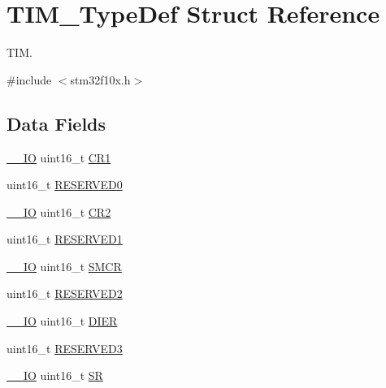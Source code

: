 \hypertarget{struct_t_i_m___type_def}{}\section{T\+I\+M\+\_\+\+Type\+Def Struct Reference}
\label{struct_t_i_m___type_def}


T\+IM.  




{\ttfamily \#include $<$stm32f10x.\+h$>$}

\subsection*{Data Fields}
\begin{DoxyCompactItemize}
\item 
\mbox{\hyperlink{core__sc300_8h_aec43007d9998a0a0e01faede4133d6be}{\+\_\+\+\_\+\+IO}} uint16\+\_\+t \mbox{\hyperlink{struct_t_i_m___type_def_a61400ce239355b62aa25c95fcc18a5e1}{C\+R1}}
\item 
uint16\+\_\+t \mbox{\hyperlink{struct_t_i_m___type_def_a149feba01f9c4a49570c6d88619f504f}{R\+E\+S\+E\+R\+V\+E\+D0}}
\item 
\mbox{\hyperlink{core__sc300_8h_aec43007d9998a0a0e01faede4133d6be}{\+\_\+\+\_\+\+IO}} uint16\+\_\+t \mbox{\hyperlink{struct_t_i_m___type_def_a2a3e81bd118d1bc52d24a0b0772e6a0c}{C\+R2}}
\item 
uint16\+\_\+t \mbox{\hyperlink{struct_t_i_m___type_def_a8249a3955aace28d92109b391311eb30}{R\+E\+S\+E\+R\+V\+E\+D1}}
\item 
\mbox{\hyperlink{core__sc300_8h_aec43007d9998a0a0e01faede4133d6be}{\+\_\+\+\_\+\+IO}} uint16\+\_\+t \mbox{\hyperlink{struct_t_i_m___type_def_a02758713abfe580460dd5bcd8762702a}{S\+M\+CR}}
\item 
uint16\+\_\+t \mbox{\hyperlink{struct_t_i_m___type_def_a5573848497a716a9947fd87487709feb}{R\+E\+S\+E\+R\+V\+E\+D2}}
\item 
\mbox{\hyperlink{core__sc300_8h_aec43007d9998a0a0e01faede4133d6be}{\+\_\+\+\_\+\+IO}} uint16\+\_\+t \mbox{\hyperlink{struct_t_i_m___type_def_a1481b34cc41018c17e4ab592a1c8cb55}{D\+I\+ER}}
\item 
uint16\+\_\+t \mbox{\hyperlink{struct_t_i_m___type_def_a6c3b31022e6f59b800e9f5cc2a89d54c}{R\+E\+S\+E\+R\+V\+E\+D3}}
\item 
\mbox{\hyperlink{core__sc300_8h_aec43007d9998a0a0e01faede4133d6be}{\+\_\+\+\_\+\+IO}} uint16\+\_\+t \mbox{\hyperlink{struct_t_i_m___type_def_a44962ea5442d203bf4954035d1bfeb9d}{SR}}
\item 

\end{DoxyCompactItemize}
